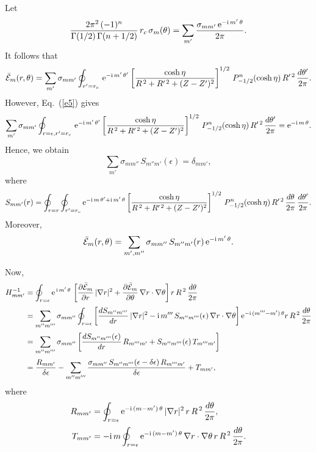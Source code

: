 \documentclass[12pt,prb,aps,notitlepage]{revtex4-1}
\begin{document}
Let 
\begin{equation}
\frac{2\pi^2\,(-1)^n}{\Gamma(1/2)\,\Gamma(n+1/2)}\,r_c\,\sigma_m(\theta)=\sum_{m'}\frac{\sigma_{mm'}\,{\rm e}^{-{\rm i}\,m'\,\theta}}{2\pi}.
\end{equation}
It follows that
\begin{equation}
\bar{\cal E}_m(r,\theta) = \sum_{m'}\sigma_{mm'}\oint_{r'=r_c}\,{\rm e}^{-{\rm i}\,m'\,\theta'}\left[\frac{\cosh\eta}
{R^{\,2} + R'^{\,2}+(Z-Z')^2}\right]^{1/2}\,P_{-1/2}^n(\cosh\eta)\,R'^{\,2}\,\frac{d\theta'}{2\pi}.
\end{equation}
However, Eq.~(\ref{e5}) gives
\begin{equation}
\sum_{m'}\sigma_{mm'}\oint_{r=\epsilon,r'=r_c}\,{\rm e}^{-{\rm i}\,m'\,\theta'}\left[\frac{\cosh\eta}
{R^{\,2} + R'^{\,2}+(Z-Z')^2}\right]^{1/2}\,P_{-1/2}^n(\cosh\eta)\,R'^{\,2}\,\frac{d\theta'}{2\pi} = {\rm e}^{-{\rm i}\,m\,\theta}.
\end{equation}
Hence, we obtain
\begin{equation}
\sum_{m'}\sigma_{mm''}\,S_{m''m'}(\epsilon) = \delta_{mm'},
\end{equation}
where
\begin{equation}
S_{mm'}(r) = \oint_{r=r}\oint_{r'=r_c}{\rm e}^{-{\rm i}\,m\,\theta'+{\rm i}\,m'\,\theta}\left[\frac{\cosh\eta}
{R^{\,2} + R'^{\,2}+(Z-Z')^2}\right]^{1/2}\,P_{-1/2}^n(\cosh\eta)\,R'^{\,2}\,\frac{d\theta}{2\pi}\,\frac{d\theta'}{2\pi}.
\end{equation}
Moreover,
\begin{equation}
\bar{\cal E}_m(r,\theta) = \sum_{m',m''} \sigma_{mm''}\,S_{m''m'}(r)\,{\rm e}^{-{\rm i}\,m'\,\theta}.
\end{equation}

Now,
\begin{align}
H_{mm'}^{-1} &=\oint_{r=\epsilon} {\rm e}^{\,{\rm i}\,m'\,\theta}\,\left[\frac{\partial\bar{\cal E}_m}{\partial r}\,|\nabla r|^2+ \frac{\partial\bar{\cal E}_m}{\partial\theta}\,\nabla r\cdot\nabla\theta\right]r\,R^{\,2}\,\frac{d\theta}{2\pi}\nonumber\\[0.5ex]
&= \sum_{m''m'''}\sigma_{mm''}\oint_{r=\epsilon} \left[\frac{dS_{m''m'''}}{dr}\,|\nabla r|^2-{\rm i}\,m'''\,S_{m''m'''}(\epsilon)\,
\nabla r\cdot\nabla\theta\right]{\rm e}^{-{\rm i}\,(m'''-m')\,\theta}r\,R^{\,2}\,\frac{d\theta}{2\pi}\nonumber\\[0.5ex]
&= \sum_{m''m'''}\sigma_{mm''}\left[\frac{dS_{m''m'''}(\epsilon)}{dr}\,R_{m'''m'}+S_{m''m'''}(\epsilon)\,T_{m'''m'}\right]\nonumber\\[0.5ex]
&=\frac{R_{mm'}}{\delta\epsilon} -\sum_{m''m'''}\frac{\sigma_{mm''}\,S_{m''m'''}(\epsilon-\delta\epsilon)\,R_{m'''m'} }{\delta\epsilon} +T_{mm'},
\end{align}
where
\begin{align}
R_{mm'} &= \oint_{r=\epsilon} {\rm e}^{-{\rm i}\,(m-m')\,\theta}\,|\nabla r|^2\,r\,R^{\,2}\,\frac{d\theta}{2\pi},\\[0.5ex]
T_{mm'} &= -{\rm i}\,m\oint_{r=\epsilon} {\rm e}^{-{\rm i}\,(m-m')\,\theta}\,\nabla r\cdot\nabla\theta\,r\,R^{\,2}\,\frac{d\theta}{2\pi}.
\end{align}
\end{document}
